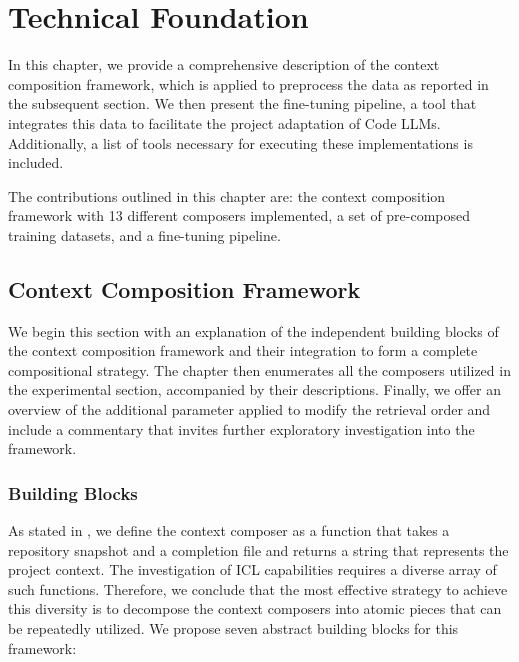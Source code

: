 \chapter{Technical Foundation}\label{chap:technical-foundation}  %

In this chapter, we provide a comprehensive description of the context composition framework, which is applied to preprocess the data as reported in the subsequent section. We then present the fine-tuning pipeline, a tool that integrates this data to facilitate the project adaptation of Code LLMs. Additionally, a list of tools necessary for executing these implementations is included.

The contributions outlined in this chapter are: the context composition framework with 13 different composers implemented, a set of pre-composed training datasets, and a fine-tuning pipeline.

\section{Context Composition Framework}

We begin this section with an explanation of the independent building blocks of the context composition framework and their integration to form a complete compositional strategy. The chapter then enumerates all the composers utilized in the experimental section, accompanied by their descriptions. Finally, we offer an overview of the additional parameter applied to modify the retrieval order and include a commentary that invites further exploratory investigation into the framework.

\subsection{Building Blocks}

As stated in , we define the context composer as a function that takes a repository snapshot and a completion file and returns a string that represents the project context. The investigation of ICL capabilities requires a diverse array of such functions. Therefore, we conclude that the most effective strategy to achieve this diversity is to decompose the context composers into atomic pieces that can be repeatedly utilized. We propose seven abstract building blocks for this framework:

